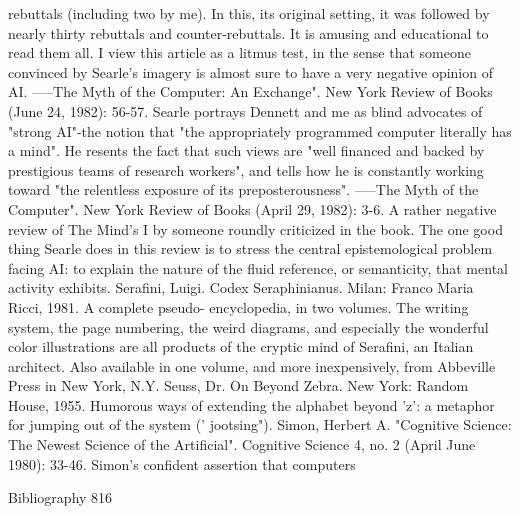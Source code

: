   rebuttals (including two by me). In this, its original setting, it was followed by nearly thirty
  rebuttals and counter-rebuttals. It is amusing and educational to read them all. I view this
  article as a litmus test, in the sense that someone convinced by Searle's imagery is almost
  sure to have a very negative opinion of AI.
-----The Myth of the Computer: An Exchange". New York Review of Books (June 24, 1982):
  56-57. Searle portrays Dennett and me as blind advocates of "strong AI"-the notion that "the
  appropriately programmed computer literally has a mind". He resents the fact that such
  views are "well financed and backed by prestigious teams of research workers", and tells
  how he is constantly working toward "the relentless exposure of its preposterousness".
-----The Myth of the Computer". New York Review of Books (April 29, 1982): 3-6. A rather
  negative review of The Mind's I by someone roundly criticized in the book. The one good
  thing Searle does in this review is to stress the central epistemological problem facing AI: to
  explain the nature of the fluid reference, or semanticity, that mental activity exhibits.
Serafini, Luigi. Codex Seraphinianus. Milan: Franco Maria Ricci, 1981. A complete pseudo-
  encyclopedia, in two volumes. The writing system, the page numbering, the weird
  diagrams, and especially the wonderful color illustrations are all products of the cryptic
  mind of Serafini, an Italian architect. Also available in one volume, and more
  inexpensively, from Abbeville Press in New York, N.Y.
Seuss, Dr. On Beyond Zebra. New York: Random House, 1955. Humorous ways of extending
  the alphabet beyond 'z': a metaphor for jumping out of the system (' jootsing").
Simon, Herbert A. "Cognitive Science: The Newest Science of the Artificial". Cognitive
  Science 4, no. 2 (April June 1980): 33-46. Simon's confident assertion that computers

Bibliography                                                                                   816

